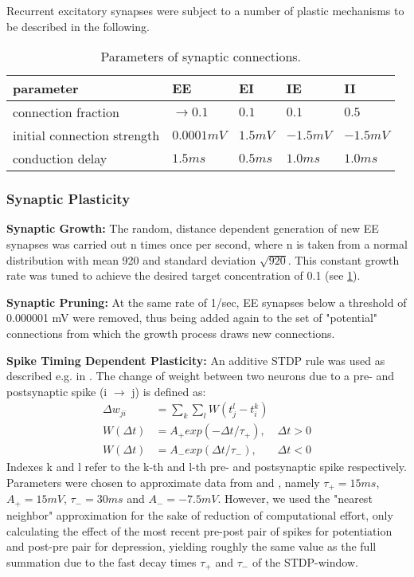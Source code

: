 \documentclass[10pt,a4paper]{article}
\begin{document}
Recurrent excitatory synapses were subject to a number of plastic mechanisms to be described in the following. 

\begin{table}
\begin{tabular}{|l|l|l|l|l|}
\hline
\textbf{parameter} & \textbf{EE} & \textbf{EI} & \textbf{IE} & \textbf{II} \\ \hline
connection fraction & $\rightarrow 0.1$ & $0.1$ & $0.1$ & $0.5$ \\ \hline
initial connection strength & $0.0001 mV$ & $1.5 mV$ & $-1.5 mV$ & $-1.5 mV$ \\ \hline
conduction delay & $1.5 ms$ & $0.5 ms$ & $1.0 ms$ & $1.0 ms$ \\
\hline
\end{tabular}
\caption{Parameters of synaptic connections.}
\label{syn_conn_params}
\end{table}
\newpage
\subsubsection{Synaptic Plasticity}
\textbf{Synaptic Growth:} The random, distance dependent generation of new EE synapses was carried out n times once per second, where n is taken from a normal distribution with mean 920 and standard deviation $\sqrt{920}$. This constant growth rate was tuned to achieve the desired target concentration of 0.1 (see \ref{syn_conn_params}).

\textbf{Synaptic Pruning:} At the same rate of 1/sec, EE synapses below a threshold of 0.000001 mV were removed, thus being added again to the set of "potential" connections from which the growth process draws new connections.

\textbf{Spike Timing Dependent Plasticity:} An additive STDP rule was used as described e.g. in \cite{Zhang_STDP}. The change of weight between two neurons due to a pre- and postsynaptic spike (i $\rightarrow$ j) is defined as:
\begin{align}
\Delta w_{ji} &= \sum_k \sum_l W(t_j^l - t_i^k) \label{STDP_rule} \\
W(\Delta t) &= A_{+} exp(-\Delta t / \tau_{+}), & \Delta t > 0 \label{STDP_pos} \\
W(\Delta t) &= A_{-} exp(\Delta t / \tau_{-}), & \Delta t < 0 \label{STDP_neg}
\end{align}
Indexes k and l refer to the k-th and l-th pre- and postsynaptic spike respectively. Parameters were chosen to approximate data from \cite{Bi_Poo_STDP} and \cite{Froemke_STDP}, namely $\tau_{+} = 15 ms$, $A_{+} = 15 mV$, $\tau_{-} = 30 ms$ and $A_{-} = -7.5 mV$. However, we used the "nearest neighbor" approximation for the sake of reduction of computational effort, only calculating the effect of the most recent pre-post pair of spikes for potentiation and post-pre pair for depression, yielding roughly the same value as the full summation due to the fast decay times $\tau_{+}$ and $\tau_{-}$ of the STDP-window.
\end{document}
